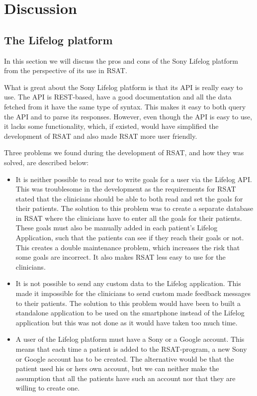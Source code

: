 \documentclass{cslthse-msc}
\begin{document}
\chapter{Discussion}

\section{The Lifelog platform}


In this section we will discuss the pros and cons of the Sony Lifelog platform from the perspective of its use in RSAT. 

What is great about the Sony Lifelog platform is that its API is really easy to use. The API is REST-based, have a good documentation and all the data fetched from it have the same type of syntax. This makes it easy to both query the API and to parse its responses. However, even though the API is easy to use, it lacks some functionality, which, if existed, would have simplified the development of RSAT and also made RSAT more user friendly. 

Three problems we found during the development of RSAT, and how they was solved, are described below:

\begin{itemize}

\item It is neither possible to read nor to write goals for a user via the Lifelog API. This was troublesome in the development as the requirements for RSAT stated that the clinicians should be able to both read and set the goals for their patients. The solution to this problem was to create a separate database in RSAT where the clinicians have to enter all the goals for their patients. These goals must also be manually added in each patient’s Lifelog Application, such that the patients can see if they reach their goals or not. This creates a double maintenance problem, which increases the risk that some goals are incorrect. It also makes RSAT less easy to use for the clinicians. 

\item It is not possible to send any custom data to the Lifelog application. This made it impossible for the clinicians to send custom made feedback messages to their patients. The solution to this problem would have been to built a standalone application to be used on the smartphone instead of the Lifelog application but this was not done as it would have taken too much time. 

\item A user of the Lifelog platform must have a Sony or a Google account. This means that each time a patient is added to the RSAT-program, a new Sony or Google account has to be created. The alternative would be that the patient used his or hers own account, but we can neither make the assumption that all the patients have such an account nor that they are willing to create one. 

\end{itemize}
\end{document}
